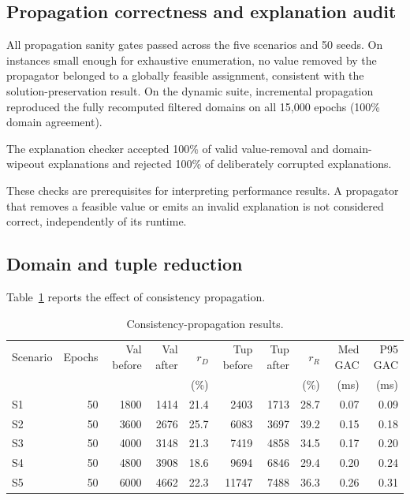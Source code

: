 \documentclass[pdflatex,sn-mathphys-num,iicol,oneside]{sn-jnl}
\begin{document}
\subsection{Propagation correctness and explanation audit}

All propagation sanity gates passed across the five scenarios and 50
seeds. On instances small enough for exhaustive enumeration, no value
removed by the propagator belonged to a globally feasible assignment,
consistent with the solution-preservation result. On the dynamic suite,
incremental propagation reproduced the fully recomputed filtered
domains on all 15{,}000 epochs (100\% domain agreement).

The explanation checker accepted 100\% of valid value-removal and
domain-wipeout explanations and rejected 100\% of deliberately
corrupted explanations.

These checks are prerequisites for interpreting performance results.
A propagator that removes a feasible value or emits an invalid
explanation is not considered correct, independently of its runtime.

\subsection{Domain and tuple reduction}

Table~\ref{tab:propagation-results} reports the effect of consistency
propagation.

\begin{table}[t]
\centering
\caption{Consistency-propagation results.}
\label{tab:propagation-results}
\setlength{\tabcolsep}{4pt}\small
\begin{tabular}{lrrrrrrrrr}
\toprule
Scenario & Epochs & Val before & Val after & $r_D$ & Tup before & Tup after & $r_R$ & Med GAC & P95 GAC\\
& & & & (\%) & & & (\%) & (ms) & (ms)\\
\midrule
S1 & 50 & 1800 & 1414 & 21.4 & 2403 & 1713 & 28.7 & 0.07 & 0.09\\
S2 & 50 & 3600 & 2676 & 25.7 & 6083 & 3697 & 39.2 & 0.15 & 0.18\\
S3 & 50 & 4000 & 3148 & 21.3 & 7419 & 4858 & 34.5 & 0.17 & 0.20\\
S4 & 50 & 4800 & 3908 & 18.6 & 9694 & 6846 & 29.4 & 0.20 & 0.24\\
S5 & 50 & 6000 & 4662 & 22.3 & 11747 & 7488 & 36.3 & 0.26 & 0.31\\
\bottomrule
\end{tabular}
\normalsize
\end{table}
\end{document}
